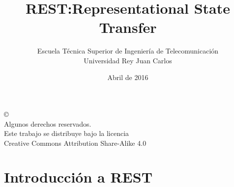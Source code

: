 \documentclass[ucs]{beamer}
\begin{document}
\title[REST]{REST:Representational State Transfer}
\author[GSyC]{Escuela Técnica Superior de Ingeniería de Telecomunicación\\
Universidad Rey Juan Carlos}
\date[2016]{Abril de 2016}


\begin{frame}
  \titlepage
\end{frame}



\begin{frame}[b]
\begin{flushright}
{\tiny
\copyright \insertshortdate~\insertshortauthor \\
  Algunos derechos reservados. \\
  Este trabajo se distribuye bajo la licencia \\
  Creative Commons Attribution Share-Alike 4.0\\
}
\end{flushright}  
\end{frame}









\section{Introducción a REST}
\end{document}
